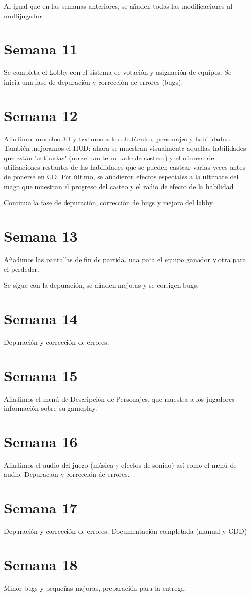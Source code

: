 \documentclass{article}
\begin{document}
Al igual que en las semanas anteriores, se añaden todas las modificaciones al multijugador.

\section*{Semana 11}
Se completa el Lobby con el sistema de votación y asignación de equipos.
Se inicia una fase de depuración y corrección de errores (bugs).

\section*{Semana 12}
Añadimos modelos 3D y texturas a los obstáculos, personajes y habilidades. También mejoramos el HUD: ahora se muestran visualmente aquellas habilidades que están "activadas" (no se han terminado de castear) y el número de utilizaciones restantes de las habilidades que se pueden castear varias veces antes de ponerse en CD. Por último, se añadieron efectos especiales a la ultimate del mago que muestran el progreso del casteo y el radio de efecto de la habilidad.

Continua la fase de depuración, corrección de bugs y mejora del lobby.
	
\section*{Semana 13}
Añadimos las pantallas de fin de partida, una para el equipo ganador y otra para el perdedor.	

Se sigue con la depuración, se añaden mejoras y se corrigen bugs.
	
\section*{Semana 14}
Depuración y corrección de errores.

\section*{Semana 15}
Añadimos el menú de Descripción de Personajes, que muestra
a los jugadores información sobre su gameplay.

\section*{Semana 16}
Añadimos el audio del juego (música y efectos de sonido) así como el menú de audio.
Depuración y corrección de errores.

\section*{Semana 17}
Depuración y corrección de errores.
Documentación completada (manual y GDD)

\section*{Semana 18}
Minor bugs y pequeñas mejoras, preparación para la entrega.
\end{document}
